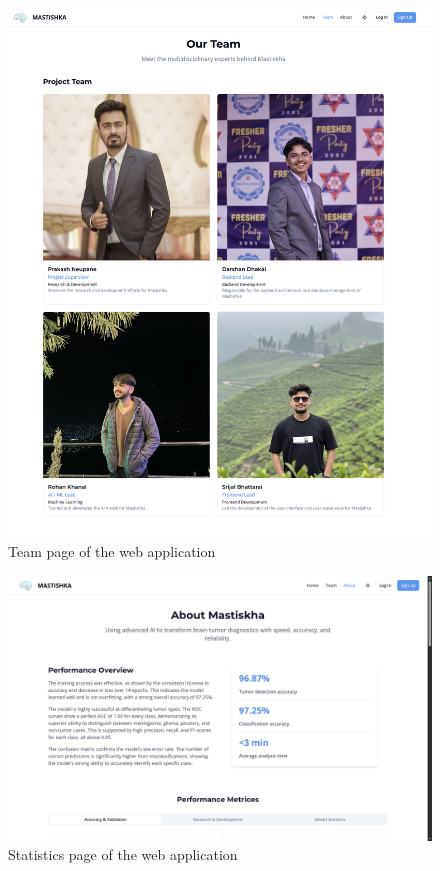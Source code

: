 \begin{figure}[H]
    \centering
    \includegraphics[width=0.7\linewidth]{App/team.png}
    \caption{Team page of the web application}
    \label{fig:team_page}
\end{figure}

\begin{figure}[H]
    \centering
    \includegraphics[width=1\linewidth]{App/stats.png}
    \caption{Statistics page of the web application}
    \label{fig:stats_page}
\end{figure}

